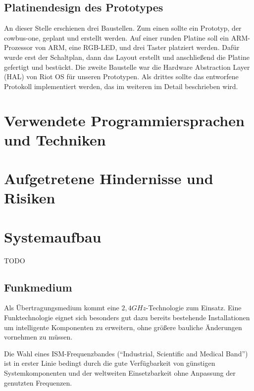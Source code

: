 \documentclass{IEEEtran}
\begin{document}
    \subsection{Platinendesign des Prototypes}
    An dieser Stelle erschienen drei Baustellen. Zum einen sollte ein Prototyp, der cowbus-one, geplant und erstellt werden. Auf einer runden Platine soll ein ARM-Prozessor von ARM, eine RGB-LED, und drei Taster platziert werden. Dafür wurde erst der Schaltplan, dann das Layout erstellt und anschließend die Platine gefertigt und bestückt.
    Die zweite Baustelle war die Hardware Abstraction Layer (HAL) von Riot OS für unseren Prototypen. Als drittes sollte das entworfene Protokoll implementiert werden, das im weiteren im Detail beschrieben wird.

    

\section{Verwendete Programmiersprachen und Techniken}


\section{Aufgetretene Hindernisse und Risiken}

\section{Systemaufbau}
    TODO

    \subsection{Funkmedium}
        Als Übertragungsmedium kommt eine $2,4GHz$-Technologie
        zum Einsatz. Eine Funktechnologie eignet sich besonders gut dazu
        bereits bestehende Installationen um intelligente Komponenten
        zu erweitern, ohne größere bauliche Änderungen vornehmen zu müssen.

        Die Wahl eines ISM-Frequenzbandes (\enquote{Industrial, Scientific and Medical Band})
        ist in erster Linie bedingt durch die gute Verfügbarkeit von günstigen
        Systemkomponenten und der weltweiten Einsetzbarkeit ohne Anpassung der
        genutzten Frequenzen.
\end{document}
